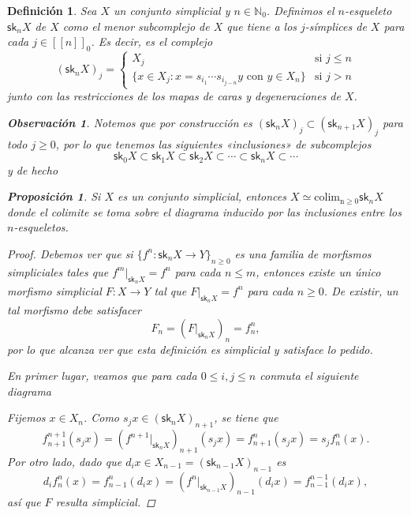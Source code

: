 \documentclass[11pt]{report}
\theoremstyle{colored}
\newtheorem{definition}{Definición}[section]
\newtheorem{proposition}{Proposición}[section]
\newtheorem{remark}{Observación}[section]
\newcommand{\N}{\mathbb{N}}
\newcommand{\nat}[1]{[\![#1]\!]}
\newcommand{\natzero}[1]{\nat{#1}_0}
\newcommand{\sk}{\mathsf{sk}}
\newcommand{\guill}[1]{«#1»}
\begin{document}
\begin{definition} Sea $X$ un conjunto simplicial y $n \in \N_0$. Definimos el $n$-esqueleto $\sk_n X$ de $X$ como el menor subcomplejo de $X$ que tiene a los $j$-símplices de $X$ para cada $j \in \natzero{n}$. Es decir, es el complejo
\[
(\sk_nX)_j = \begin{cases}
X_j &\text{si $j \leq n$}\\
\{x \in X_j : x = s_{i_1} \cdots s_{i_{j-n}}y \text{ con } y \in X_n\} &\text{si $j > n$}
\end{cases}
\]
junto con las restricciones de los mapas de caras y degeneraciones de $X$. 

\begin{remark}Notemos que por construcción es $(\sk_n X)_j \subset (\sk_{n+1} X)_j$ para todo $j \geq 0$, por lo que tenemos las siguientes \guill{inclusiones} de subcomplejos
\[
\sk_0X \subset \sk_1X \subset \sk_2X \subset \cdots \subset \sk_nX \subset \cdots
\]
y de hecho
\end{remark}

\begin{proposition} Si $X$ es un conjunto simplicial, entonces $X \simeq \operatorname{colim_{n \geq 0}} \sk_nX$ donde el colimite se toma sobre el diagrama inducido por las inclusiones entre los $n$-esqueletos.
\end{proposition}
\begin{proof} Debemos ver que si $\{f^n : \sk_nX \to Y\}_{n\geq 0}$ es una familia de morfismos simpliciales tales que $f^m|_{\sk_nX} = f^n$ para cada $n \leq m$, entonces existe un único morfismo simplicial $F : X \to Y$ tal que $F|_{\sk_nX} = f^n$ para cada $n \geq 0$. De existir, un tal morfismo debe satisfacer
\[
F_n = (F|_{\sk_nX})_n = f^n_n, 
\]
por lo que alcanza ver que esta definición es simplicial y satisface lo pedido. 

En primer lugar, veamos que para cada $0\leq i,j \leq n $ conmuta el siguiente diagrama
\begin{center}
\end{center}
Fijemos $x \in X_n$. Como $s_jx \in (\sk_nX)_{n+1}$, se tiene que
\[
f^{n+1}_{n+1}(s_jx) = (f^{n+1}|_{\sk_nX})_{n+1}(s_jx) = f^n_{n+1}(s_jx) = s_jf^n_n(x).
\]
Por otro lado, dado que $d_ix \in X_{n-1} = (\sk_{n-1}X)_{n-1}$ es
\[
d_if^n_n(x) = f^n_{n-1}(d_ix) = (f^n|_{\sk_{n-1}X})_{n-1}(d_ix) = f^{n-1}_{n-1}(d_ix),
\]
así que $F$ resulta simplicial.


\end{proof}
\end{definition}
\end{document}
